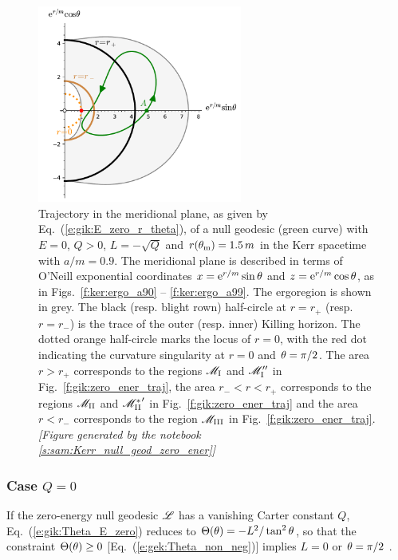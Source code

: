 \begin{figure}
\centerline{\includegraphics[width=0.6\textwidth]{gik_zero_ener_merid.pdf}}
\caption[]{\label{f:gik:zero_ener_merid} \footnotesize
Trajectory in the meridional plane, as given by Eq.~(\ref{e:gik:E_zero_r_theta}), of a null geodesic (green curve)
with $E=0$, $Q>0$, $L = - \sqrt{Q}$ and $r(\theta_{\rm m}) = 1.5 \, m$
in the Kerr spacetime with $a/m = 0.9$.
The meridional plane is described in terms of
O'Neill exponential coordinates $x = \mathrm{e}^{r/m}\sin\theta$ and $z = \mathrm{e}^{r/m}\cos\theta$,
as in Figs.~\ref{f:ker:ergo_a90} -- \ref{f:ker:ergo_a99}.
The ergoregion is shown in grey.
The black (resp. blight rown) half-circle at $r=r_+$ (resp. $r=r_-$)
is the trace of the outer (resp. inner) Killing horizon.
The dotted orange half-circle marks the locus of $r=0$, with the
red dot indicating the curvature singularity at $r=0$ and $\theta=\pi/2$.
The area $r> r_+$
corresponds to the regions $\mathscr{M}_{\rm I}$ and $\mathscr{M}_{\rm I}''$ in Fig.~\ref{f:gik:zero_ener_traj},
the area  $r_- < r < r_+$
corresponds to the regions $\mathscr{M}_{\rm II}$ and ${\mathscr{M}_{\rm II}^*}'$  in Fig.~\ref{f:gik:zero_ener_traj} and the area $r < r_-$
corresponds to the region $\mathscr{M}_{\rm III}$ in Fig.~\ref{f:gik:zero_ener_traj}.
\textsl{[Figure generated by the notebook \ref{s:sam:Kerr_null_geod_zero_ener}]}
}
\end{figure}

\subsubsection{Case $Q=0$}

If the zero-energy null geodesic $\mathscr{L}$ has a vanishing Carter constant $Q$, Eq.~(\ref{e:gik:Theta_E_zero}) reduces to $\Theta(\theta) = -L^2 / \tan^2\theta$,
so that the constraint $\Theta(\theta) \geq 0$ [Eq.~(\ref{e:gek:Theta_non_neg})]
implies $L=0$ or $\theta = \pi/2$ .

